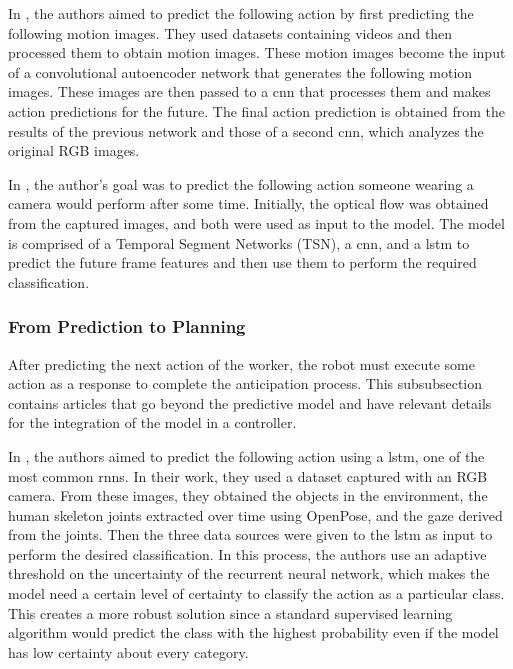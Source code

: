 In \textcite{Rodriguez2019}, the authors aimed to predict the following action by first predicting the following motion images. They used datasets containing videos and then processed them to obtain motion images. These motion images become the input of a convolutional autoencoder network that generates the following motion images. These images are then passed to a \acs{cnn} that processes them and makes action predictions for the future. The final action prediction is obtained from the results of the previous network and those of a second \acs{cnn}, which analyzes the original RGB images.

In \textcite{Wu2021}, the author's goal was to predict the following action someone wearing a camera would perform after some time. Initially, the optical flow was obtained from the captured images, and both were used as input to the model. The model is comprised of a Temporal Segment Networks (TSN), a \acs{cnn}, and a \acs{lstm} to predict the future frame features and then use them to perform the required classification.

\subsubsection{From Prediction to Planning}

After predicting the next action of the worker, the robot must execute some action as a response to complete the anticipation process. This subsubsection contains articles that go beyond the predictive model and have relevant details for the integration of the model in a controller.

In \textcite{Canuto2021}, the authors aimed to predict the following action using a \acs{lstm}, one of the most common \acp{rnn}. In their work, they used a dataset captured with an RGB camera. From these images, they obtained the objects in the environment, the human skeleton joints extracted over time using OpenPose, and the gaze derived from the joints. Then the three data sources were given to the \acs{lstm} as input to perform the desired classification. In this process, the authors use an adaptive threshold on the uncertainty of the recurrent neural network, which makes the model need a certain level of certainty to classify the action as a particular class. This creates a more robust solution since a standard supervised learning algorithm would predict the class with the highest probability even if the model has low certainty about every category.

